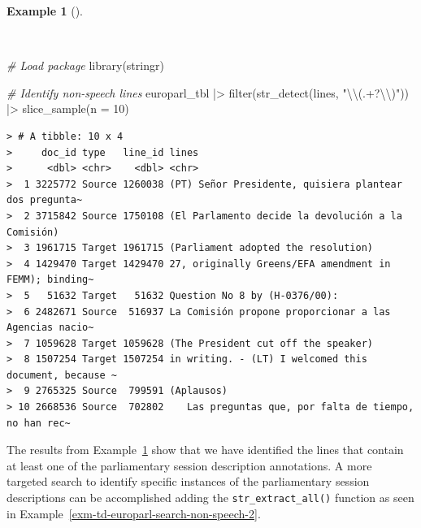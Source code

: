 \documentclass[
  letterpaper,
  DIV=11,
  numbers=noendperiod]{scrreprt}
\newenvironment{Shaded}{\begin{snugshade}}{\end{snugshade}}
\newcommand{\AttributeTok}[1]{\textcolor[rgb]{0.00,0.00,0.00}{#1}}
\newcommand{\CommentTok}[1]{\textcolor[rgb]{0.00,0.00,0.00}{\textit{#1}}}
\newcommand{\DecValTok}[1]{\textcolor[rgb]{0.00,0.00,0.00}{#1}}
\newcommand{\FunctionTok}[1]{\textcolor[rgb]{0.00,0.00,0.00}{#1}}
\newcommand{\NormalTok}[1]{\textcolor[rgb]{0.00,0.00,0.00}{#1}}
\newcommand{\SpecialCharTok}[1]{\textcolor[rgb]{0.00,0.00,0.00}{#1}}
\newcommand{\StringTok}[1]{\textcolor[rgb]{0.00,0.00,0.00}{#1}}
\theoremstyle{definition}
\newtheorem{example}{Example}[chapter]
\theoremstyle{remark}
\begin{document}
\begin{example}[]\protect\hypertarget{exm-td-europarl-search-non-speech}{}\label{exm-td-europarl-search-non-speech}

~

\begin{Shaded}
\begin{Highlighting}[]
\CommentTok{\# Load package}
\FunctionTok{library}\NormalTok{(stringr)}

\CommentTok{\# Identify non{-}speech lines}
\NormalTok{europarl\_tbl }\SpecialCharTok{|\textgreater{}}
  \FunctionTok{filter}\NormalTok{(}\FunctionTok{str\_detect}\NormalTok{(lines, }\StringTok{"}\SpecialCharTok{\textbackslash{}\textbackslash{}}\StringTok{(.+?}\SpecialCharTok{\textbackslash{}\textbackslash{}}\StringTok{)"}\NormalTok{)) }\SpecialCharTok{|\textgreater{}}
  \FunctionTok{slice\_sample}\NormalTok{(}\AttributeTok{n =} \DecValTok{10}\NormalTok{)}
\end{Highlighting}
\end{Shaded}

\begin{verbatim}
> # A tibble: 10 x 4
>     doc_id type   line_id lines                                                 
>      <dbl> <chr>    <dbl> <chr>                                                 
>  1 3225772 Source 1260038 (PT) Señor Presidente, quisiera plantear dos pregunta~
>  2 3715842 Source 1750108 (El Parlamento decide la devolución a la Comisión)    
>  3 1961715 Target 1961715 (Parliament adopted the resolution)                   
>  4 1429470 Target 1429470 27, originally Greens/EFA amendment in FEMM); binding~
>  5   51632 Target   51632 Question No 8 by (H-0376/00):                         
>  6 2482671 Source  516937 La Comisión propone proporcionar a las Agencias nacio~
>  7 1059628 Target 1059628 (The President cut off the speaker)                   
>  8 1507254 Target 1507254 in writing. - (LT) I welcomed this document, because ~
>  9 2765325 Source  799591 (Aplausos)                                            
> 10 2668536 Source  702802    Las preguntas que, por falta de tiempo, no han rec~
\end{verbatim}

\end{example}

The results from Example~\ref{exm-td-europarl-search-non-speech} show
that we have identified the lines that contain at least one of the
parliamentary session description annotations. A more targeted search to
identify specific instances of the parliamentary session descriptions
can be accomplished adding the \texttt{str\_extract\_all()} function as
seen in Example~\ref{exm-td-europarl-search-non-speech-2}.
\end{document}
